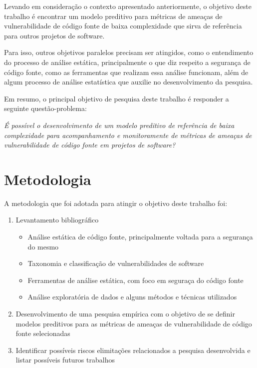 Levando em consideração o contexto apresentado anteriormente, o objetivo deste
trabalho é encontrar um modelo preditivo para métricas de ameaças de
vulnerabilidade de código fonte de baixa complexidade que sirva de referência
para outros projetos de software.

Para isso, outros objetivos paralelos precisam ser atingidos, como o
entendimento do processo de análise estática, principalmente o que diz respeito
a segurança de código fonte, como as ferramentas que realizam essa análise
funcionam, além de algum processo de análise estatística que auxilie no
desenvolvimento da pesquisa.

Em resumo, o principal objetivo de pesquisa deste trabalho é responder a
seguinte questão-problema:

\begin{center}
  \textit{É possível o desenvolvimento de um modelo preditivo de referência de
  baixa complexidade para acompanhamento e monitoramente de métricas de ameaças
de vulnerabilidade de código fonte em projetos de software?}
\end{center}


\section{Metodologia}

A metodologia que foi adotada para atingir o objetivo deste trabalho foi:

\begin{enumerate}
  \item Levantamento bibliográfico
    \begin{itemize}
      \item Análise estática de código fonte, principalmente voltada para a
        segurança do mesmo
      \item Taxonomia e classificação de vulnerabilidades de software
      \item Ferramentas de análise estática, com foco em seguraça do código
        fonte
      \item Análise exploratória de dados e alguns métodos e técnicas utilizados
    \end{itemize}

  \item Desenvolvimento de uma pesquisa empírica com o objetivo de se definir
    modelos preditivos para as métricas de ameaças de vulnerabilidade de código
    fonte selecionadas

  \item Identificar possíveis riscos elimitações relacionados a pesquisa
    desenvolvida e listar possíveis futuros trabalhos
\end{enumerate}

